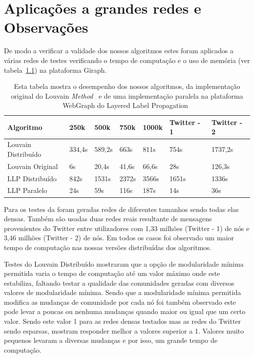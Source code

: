 \chapter{Aplicações a grandes redes e Observações}
De modo a verificar a validade dos nossos algoritmos estes foram aplicados a 
várias redes de testes verificando o tempo de computação e o uso de memória (ver 
tabela~\ref{tbl:tm}) na plataforma Giraph. 

\begin{table}
	\centering
 \begin{tabular}{|l|l|l|l|l|l|l|}
 \hline
			Algoritmo & 250k & 500k & 750k & 1000k & Twitter - 1 & Twitter - 2\\ \hline
			Louvain Distribuído&334,4s&589,2s&663s&811s&754s&1737,2s\\ \hline
			Louvain Original&6s&20,4s&41,6s&66,6s&28s&126,3s\\ \hline
			LLP Distribuído& 842s & 1531s & 2372s & 3566s & 1651s &	
1336s
\\ \hline
			LLP Paralelo&24s&59s&116s&187s&14s&36s \\ \hline
		\end{tabular}
		\caption{Esta tabela mostra o desempenho dos nossos algoritmos,
		da implementação original do Louvain 
\textit{Method}~\cite{orgLouvain} e de uma implementação paralela na plataforma 
WebGraph do Layered Label Propagation~\cite{prlLLP}}
		\label{tbl:tm}
\end{table}

  Para os testes da foram geradas redes de diferentes tamanhos sendo todas 
elas densas. Também são usadas duas redes reais resultante de mensagens 
provenientes do Twitter entre utilizadores com 1,33 milhões (Twitter - 1) de nós 
e 3,46 milhões (Twitter - 2) de nós. Em todos os casos foi observado um maior 
tempo de computação nas nossas versões distribuídas dos algoritmos.

Testes do Louvain Distribuído mostraram que a opção de modularidade mínima 
permitida varia o tempo de computação até um valor máximo onde este estabiliza, 
faltando testar a qualidade das comunidades geradas com diversos valores de 
modularidade mínima. 
Sendo que a modularidade mínima permitida modifica as mudanças de comunidade
por cada nó foi também observado este pode levar a poucas ou nenhuma mudanças 
quando maior ou igual que um certo valor. Sendo este valor 1 para as redes 
densas testados mas as redes do Twitter sendo esparsas, mostram responder melhor 
a valores superior a 1. Valores muito pequenos levaram a diversas mudanças e por 
isso, um grande tempo de computação.

